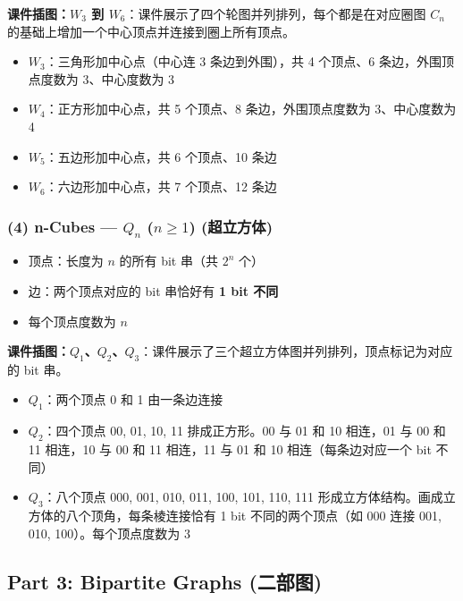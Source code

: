 \documentclass[10pt,a4paper,openany]{ctexbook}
\theoremstyle{definition}
\theoremstyle{remark}
\begin{document}
\textbf{课件插图：$W_3$ 到 $W_6$}：课件展示了四个轮图并列排列，每个都是在对应圈图 $C_n$ 的基础上增加一个中心顶点并连接到圈上所有顶点。
\begin{itemize}
\item $W_3$：三角形加中心点（中心连 3 条边到外围），共 4 个顶点、6 条边，外围顶点度数为 3、中心度数为 3
\item $W_4$：正方形加中心点，共 5 个顶点、8 条边，外围顶点度数为 3、中心度数为 4
\item $W_5$：五边形加中心点，共 6 个顶点、10 条边
\item $W_6$：六边形加中心点，共 7 个顶点、12 条边

\end{itemize}

\subsubsection{(4) n-Cubes — $Q_n$ ($n \ge 1$) (超立方体)}

\begin{itemize}
\item 顶点：长度为 $n$ 的所有 bit 串（共 $2^n$ 个）
\item 边：两个顶点对应的 bit 串恰好有 \textbf{1 bit 不同}
\item 每个顶点度数为 $n$

\end{itemize}

\textbf{课件插图：$Q_1$、$Q_2$、$Q_3$}：课件展示了三个超立方体图并列排列，顶点标记为对应的 bit 串。
\begin{itemize}
\item $Q_1$：两个顶点 0 和 1 由一条边连接
\item $Q_2$：四个顶点 00, 01, 10, 11 排成正方形。00 与 01 和 10 相连，01 与 00 和 11 相连，10 与 00 和 11 相连，11 与 01 和 10 相连（每条边对应一个 bit 不同）
\item $Q_3$：八个顶点 000, 001, 010, 011, 100, 101, 110, 111 形成立方体结构。画成立方体的八个顶角，每条棱连接恰有 1 bit 不同的两个顶点（如 000 连接 001, 010, 100）。每个顶点度数为 3

\end{itemize}

\vspace{-2pt}

\subsection{Part 3: Bipartite Graphs (二部图)}
\end{document}
